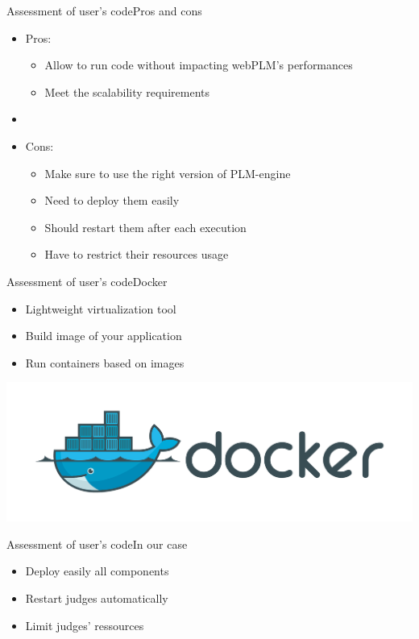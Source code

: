 \documentclass{beamer}
\begin{document}
\begin{frame}{Assessment of user's code}{Pros and cons}
  \begin{itemize}
  \item {
    Pros:
    \begin{itemize}
    \item Allow to run code without impacting webPLM's performances
    \item Meet the scalability requirements
    \end{itemize}
    \pause
  }
  \item[~]
  \item {
    Cons:
    \begin{itemize}
    \item Make sure to use the right version of PLM-engine
    \item Need to deploy them easily
    \item Should restart them after each execution
    \item Have to restrict their resources usage
    \end{itemize}
  }
  \end{itemize}
\end{frame}

\begin{frame}{Assessment of user's code}{Docker}
  \begin{itemize}
  \item {
    Lightweight virtualization tool
  }
  \item {
    Build image of your application
  }
  \item {
    Run containers based on images
  }
  \end{itemize}
  \begin{center}
    \includegraphics[scale=0.2]{img/docker-logo.png}
  \end{center}
\end{frame}

\begin{frame}{Assessment of user's code}{In our case}
  \begin{itemize}
  \item{
    Deploy easily all components
  }
  \item {
    Restart judges automatically
  }
  \item {
    Limit judges' ressources
  }
  \end{itemize}
\end{frame}
\end{document}
